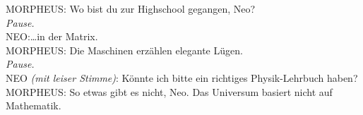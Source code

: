 \begin{playdialog}
MORPHEUS: Wo bist du zur Highschool gegangen, Neo?\\

\emph{Pause.}\\

NEO:…in der Matrix.\\

MORPHEUS: Die Maschinen erzählen elegante Lügen.\\

\emph{Pause.}\\

NEO \emph{(mit leiser Stimme)}: Könnte ich bitte ein richtiges Physik-Lehrbuch haben?\\

MORPHEUS: So etwas gibt es nicht, Neo. Das Universum basiert nicht auf Mathematik.\\

\end{playdialog}

